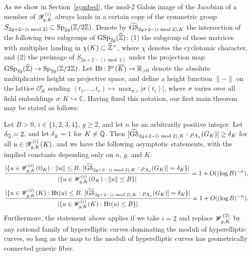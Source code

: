 As we show in Section~\ref{symbed},
the mod-$2$ Galois image of the Jacobian of a member of $\standardFamily{g}{i}{K}$ always lands in a certain copy of the symmetric group $S_{2g+2-(i \bmod 2)} \subset \Sp_{2g}(\ZZ/2\ZZ)$. Denote by $\grouphypboth{g}{(i \bmod 2)}{K}$ the intersection of the following two subgroups of $\GSp_{2g}(\wh{\ZZ})$: (1) the subgroup of those matrices with multiplier landing in $\chi(K) \subset \wh{\ZZ}^\times$, where $\chi$ denotes the cyclotomic character, and (2) the preimage of $S_{2g+2-(i \bmod 2)}$ under the projection map $\GSp_{2g}(\wh{\ZZ}) \to \Sp_{2g}(\ZZ/2\ZZ)$. 
Let $\on{Ht}\colon\mathbb P^r(\overline K) \rightarrow \mathbb R_{>0}$
denote the absolute multiplicative height on projective space, and define a height function $\| - \|$ on the lattice $\mathcal O^r_K$
sending $\left( t_1, \ldots, t_r \right) \mapsto \max_{\sigma,i}|\sigma(t_i)|$,
where $\sigma$ varies over all field embeddings $\sigma\colon K \hookrightarrow \mathbb C$.
Having fixed this notation, our first main theorem may be stated as follows:

\begin{theorem}\label{mainbldg}	
Let $B> 0$, $i \in \{1,2,3,4\}$, $g \geq 2$, and let $n$ be an arbitrarily positive integer. Let $\delta_\QQ = 2$, and let $\delta_K = 1$ for $K \neq \QQ$. Then $[ \grouphypboth g {(i \bmod 2)}{K} : \rho_{A_u}(G_K) ] \geq \delta_K$
for all $u \in \standardFamily g i K(K)$, 
and we have the following asymptotic statements, with the implied constants depending only on $n$, $g$, and $K$:
			\[
				\frac{|\{u \in \standardTarget g i K(\OO_K) : \lVert u \rVert \le B,\, [ \grouphypboth g {(i \bmod 2)}{K} : \rho_{A_u}(G_K) ] = \delta_K \}|}{|\{u \in \standardTarget g i K(\OO_K): \lVert u \rVert \le B\}|} = 1 + O((\log B)^{-n}),
			\]
\[
	\frac{|\{u \in \standardTarget g i K(K) : \on{Ht}(u) \leq B,\, [ \grouphypboth g {(i \bmod 2)}{K} : \rho_{A_u}(G_K) ] = \delta_K \}|}{|\{u \in \standardTarget g i K(K) : \on{Ht}(u) \le B\}|} = 1 + O((\log B)^{-n}). 
			\]
\noindent Furthermore, the statement above applies
if we take $i = 2$ and replace
$\standardTarget g 2 K$ by any rational family 
of hyperelliptic curves
dominating the moduli of hyperelliptic curves,
so long as the map to the moduli of hyperelliptic
curves has geometrically connected generic fiber.
\end{theorem}

